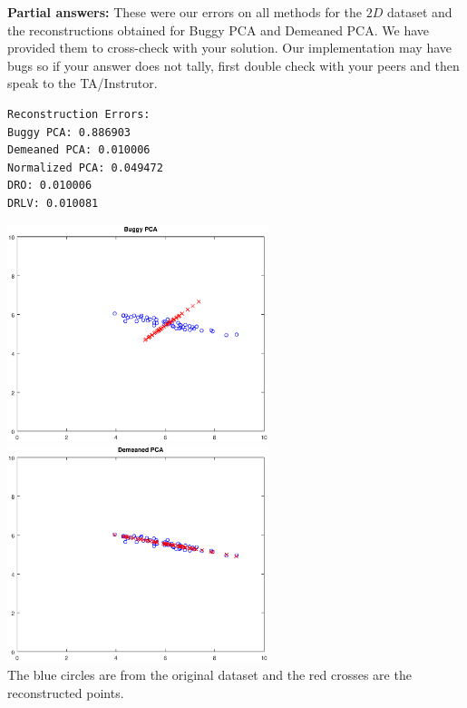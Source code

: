 \textbf{Partial answers:}
These were our errors on all methods for the $2D$ dataset and the reconstructions obtained for Buggy PCA and Demeaned PCA.
We have provided them to cross-check with your solution.
Our implementation may have bugs so if your answer does not tally, first double check with your peers and then speak to the TA/Instrutor.
\begin{verbatim}
Reconstruction Errors:
Buggy PCA: 0.886903
Demeaned PCA: 0.010006
Normalized PCA: 0.049472
DRO: 0.010006
DRLV: 0.010081
\end{verbatim}

\includegraphics[width=3in]{pcaprog/buggy_pca} \hspace{0.4in}
\includegraphics[width=3in]{pcaprog/demeaned_pca} \\
The blue circles are from the original dataset and the red crosses are the reconstructed points.

\vspace{0.2in}

